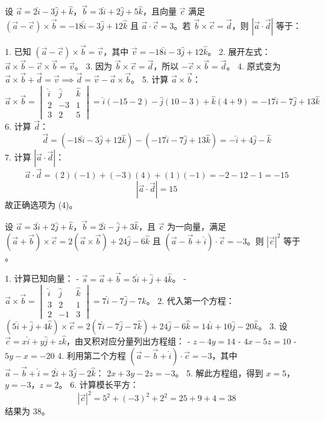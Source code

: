 \begin{questions}
\question
设 $\vec{a} = 2\hat{i} - 3\hat{j} + \hat{k}$，$\vec{b} = 3\hat{i} + 2\hat{j} + 5\hat{k}$，且向量 $\vec{c}$ 满足 $(\vec{a} - \vec{c}) \times \vec{b} = -18\hat{i} - 3\hat{j} + 12\hat{k}$ 且 $\vec{a} \cdot \vec{c} = 3$。若 $\vec{b} \times \vec{c} = \vec{d}$，则 $|\vec{a} \cdot \vec{d}|$ 等于：

\begin{solution}
1. 已知 $(\vec{a} - \vec{c}) \times \vec{b} = \vec{v}$，其中 $\vec{v} = -18\hat{i} - 3\hat{j} + 12\hat{k}$。
2. 展开左式：$\vec{a} \times \vec{b} - \vec{c} \times \vec{b} = \vec{v}$。
3. 因为 $\vec{b} \times \vec{c} = \vec{d}$，所以 $-\vec{c} \times \vec{b} = \vec{d}$。
4. 原式变为 $\vec{a} \times \vec{b} + \vec{d} = \vec{v} \implies \vec{d} = \vec{v} - \vec{a} \times \vec{b}$。
5. 计算 $\vec{a} \times \vec{b}$：
\[
\vec{a} \times \vec{b} = \begin{vmatrix} \hat{i} & \hat{j} & \hat{k} \\ 2 & -3 & 1 \\ 3 & 2 & 5 \end{vmatrix} = \hat{i}(-15 - 2) - \hat{j}(10 - 3) + \hat{k}(4 + 9) = -17\hat{i} - 7\hat{j} + 13\hat{k}
\]
6. 计算 $\vec{d}$：
\[
\vec{d} = (-18\hat{i} - 3\hat{j} + 12\hat{k}) - (-17\hat{i} - 7\hat{j} + 13\hat{k}) = -\hat{i} + 4\hat{j} - \hat{k}
\]
7. 计算 $|\vec{a} \cdot \vec{d}|$：
\[
\vec{a} \cdot \vec{d} = (2)(-1) + (-3)(4) + (1)(-1) = -2 - 12 - 1 = -15
\]
\[
|\vec{a} \cdot \vec{d}| = 15
\]
故正确选项为 (4)。
\end{solution}

\question
设 $\vec{a} = 3\hat{i} + 2\hat{j} + \hat{k}$，$\vec{b} = 2\hat{i} - \hat{j} + 3\hat{k}$，且 $\vec{c}$ 为一向量，满足 $(\vec{a} + \vec{b}) \times \vec{c} = 2(\vec{a} \times \vec{b}) + 24\hat{j} - 6\hat{k}$ 且 $(\vec{a} - \vec{b} + \hat{i}) \cdot \vec{c} = -3$。则 $|\vec{c}|^2$ 等于 \underline{\quad}。

\begin{solution}
1. 计算已知向量：
   - $\vec{s} = \vec{a} + \vec{b} = 5\hat{i} + \hat{j} + 4\hat{k}$。
   - $\vec{a} \times \vec{b} = \begin{vmatrix} \hat{i} & \hat{j} & \hat{k} \\ 3 & 2 & 1 \\ 2 & -1 & 3 \end{vmatrix} = 7\hat{i} - 7\hat{j} - 7\hat{k}$。
2. 代入第一个方程：
   $(5\hat{i} + \hat{j} + 4\hat{k}) \times \vec{c} = 2(7\hat{i} - 7\hat{j} - 7\hat{k}) + 24\hat{j} - 6\hat{k} = 14\hat{i} + 10\hat{j} - 20\hat{k}$。
3. 设 $\vec{c} = x\hat{i} + y\hat{j} + z\hat{k}$，由叉积对应分量列出方程组：
   - $z - 4y = 14$
   - $4x - 5z = 10$
   - $5y - x = -20$
4. 利用第二个方程 $(\vec{a} - \vec{b} + \hat{i}) \cdot \vec{c} = -3$，其中 $\vec{a} - \vec{b} + \hat{i} = 2\hat{i} + 3\hat{j} - 2\hat{k}$：
   $2x + 3y - 2z = -3$。
5. 解此方程组，得到 $x = 5$，$y = -3$，$z = 2$。
6. 计算模长平方：
\[
|\vec{c}|^2 = 5^2 + (-3)^2 + 2^2 = 25 + 9 + 4 = 38
\]
结果为 38。
\end{solution}


\end{questions}
